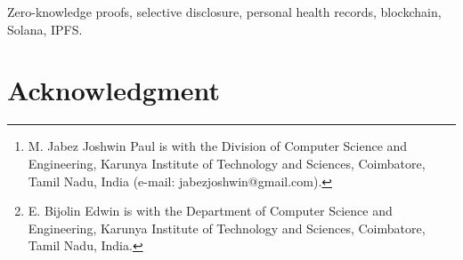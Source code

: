 \documentclass[journal]{IEEEtran}
\begin{document}
\title{\papertitle}

\author{M.~Jabez~Joshwin~Paul and E.~Bijolin~Edwin%
\thanks{M. Jabez Joshwin Paul is with the Division of Computer Science and
Engineering, Karunya Institute of Technology and Sciences, Coimbatore, Tamil
Nadu, India (e-mail: jabezjoshwin@gmail.com).}%
\thanks{E. Bijolin Edwin is with the Department of Computer Science and
Engineering, Karunya Institute of Technology and Sciences, Coimbatore, Tamil
Nadu, India.}}


\maketitle

\begin{abstract}

\end{abstract}

\begin{IEEEkeywords}
Zero-knowledge proofs, selective disclosure, personal health records,
blockchain, Solana, IPFS.
\end{IEEEkeywords}



\section*{Acknowledgment}
\aistatement



\end{document}

